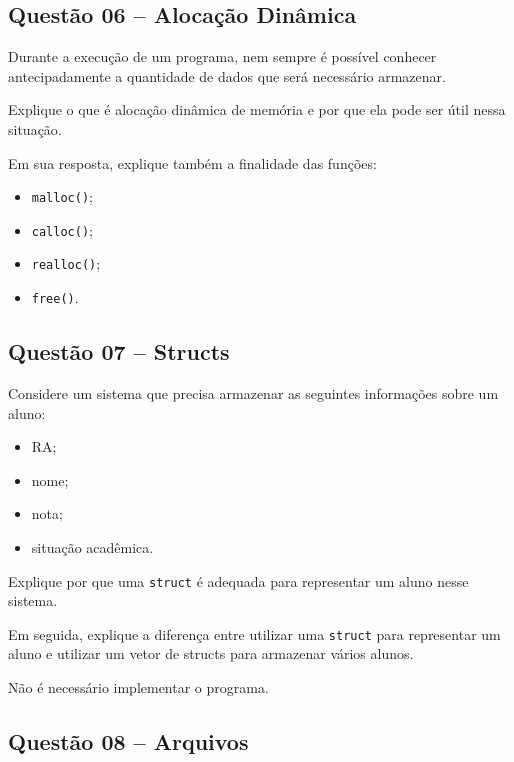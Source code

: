 \documentclass[12pt,a4paper]{article}
\begin{document}

\subsection*{Questão 06 -- Alocação Dinâmica}

Durante a execução de um programa, nem sempre é possível conhecer
antecipadamente a quantidade de dados que será necessário armazenar.

Explique o que é alocação dinâmica de memória e por que ela
pode ser útil nessa situação.

Em sua resposta, explique também a finalidade das funções:

\begin{itemize}
    \item \texttt{malloc()};
    \item \texttt{calloc()};
    \item \texttt{realloc()};
    \item \texttt{free()}.
\end{itemize}

\subsection*{Questão 07 -- Structs}

Considere um sistema que precisa armazenar as seguintes informações
sobre um aluno:

\begin{itemize}
    \item RA;
    \item nome;
    \item nota;
    \item situação acadêmica.
\end{itemize}

Explique por que uma \texttt{struct} é adequada para representar um
aluno nesse sistema.

Em seguida, explique a diferença entre utilizar uma \texttt{struct}
para representar um aluno e utilizar um vetor de
structs para armazenar vários alunos.

Não é necessário implementar o programa.


\subsection*{Questão 08 -- Arquivos}
\end{document}
